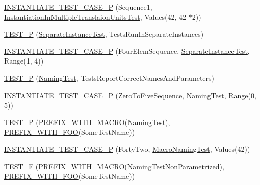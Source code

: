 \begin{DoxyCompactItemize}
\item 
\mbox{\hyperlink{googletest-param-test-test_8cc_a41c810122d57220f09f1e3d33b5a58a7}{I\+N\+S\+T\+A\+N\+T\+I\+A\+T\+E\+\_\+\+T\+E\+S\+T\+\_\+\+C\+A\+S\+E\+\_\+P}} (Sequence1, \mbox{\hyperlink{classInstantiationInMultipleTranslaionUnitsTest}{Instantiation\+In\+Multiple\+Translaion\+Units\+Test}}, Values(42, 42 $\ast$2))
\item 
\mbox{\hyperlink{googletest-param-test-test_8cc_ae517694af7a7a007acd12e9a7247afe9}{T\+E\+S\+T\+\_\+P}} (\mbox{\hyperlink{classSeparateInstanceTest}{Separate\+Instance\+Test}}, Tests\+Run\+In\+Separate\+Instances)
\item 
\mbox{\hyperlink{googletest-param-test-test_8cc_ac531206c956ac20121a4a6128e5d0912}{I\+N\+S\+T\+A\+N\+T\+I\+A\+T\+E\+\_\+\+T\+E\+S\+T\+\_\+\+C\+A\+S\+E\+\_\+P}} (Four\+Elem\+Sequence, \mbox{\hyperlink{classSeparateInstanceTest}{Separate\+Instance\+Test}}, Range(1, 4))
\item 
\mbox{\hyperlink{googletest-param-test-test_8cc_a1f8ae152b21130f3ca99bdeab97e872a}{T\+E\+S\+T\+\_\+P}} (\mbox{\hyperlink{classNamingTest}{Naming\+Test}}, Tests\+Report\+Correct\+Names\+And\+Parameters)
\item 
\mbox{\hyperlink{googletest-param-test-test_8cc_aa9659bbfc12103a583c0a221118b28ce}{I\+N\+S\+T\+A\+N\+T\+I\+A\+T\+E\+\_\+\+T\+E\+S\+T\+\_\+\+C\+A\+S\+E\+\_\+P}} (Zero\+To\+Five\+Sequence, \mbox{\hyperlink{classNamingTest}{Naming\+Test}}, Range(0, 5))
\item 
\mbox{\hyperlink{googletest-param-test-test_8cc_a268b3f484920a6a3c08d911a47f07509}{T\+E\+S\+T\+\_\+P}} (\mbox{\hyperlink{googletest-param-test-test_8cc_aeb9b224f65fb5b0b8f2323a6903d6a68}{P\+R\+E\+F\+I\+X\+\_\+\+W\+I\+T\+H\+\_\+\+M\+A\+C\+RO}}(\mbox{\hyperlink{classNamingTest}{Naming\+Test}}), \mbox{\hyperlink{googletest-param-test-test_8cc_a6414de581a925e7399b27c14e38f8a67}{P\+R\+E\+F\+I\+X\+\_\+\+W\+I\+T\+H\+\_\+\+F\+OO}}(Some\+Test\+Name))
\item 
\mbox{\hyperlink{googletest-param-test-test_8cc_a57f127249b7fcbce666fc162ee9c90d7}{I\+N\+S\+T\+A\+N\+T\+I\+A\+T\+E\+\_\+\+T\+E\+S\+T\+\_\+\+C\+A\+S\+E\+\_\+P}} (Forty\+Two, \mbox{\hyperlink{classMacroNamingTest}{Macro\+Naming\+Test}}, Values(42))
\item 
\mbox{\hyperlink{googletest-param-test-test_8cc_a025432fa6a1d1a07929f6897f2dfdaea}{T\+E\+S\+T\+\_\+F}} (\mbox{\hyperlink{googletest-param-test-test_8cc_aeb9b224f65fb5b0b8f2323a6903d6a68}{P\+R\+E\+F\+I\+X\+\_\+\+W\+I\+T\+H\+\_\+\+M\+A\+C\+RO}}(Naming\+Test\+Non\+Parametrized), \mbox{\hyperlink{googletest-param-test-test_8cc_a6414de581a925e7399b27c14e38f8a67}{P\+R\+E\+F\+I\+X\+\_\+\+W\+I\+T\+H\+\_\+\+F\+OO}}(Some\+Test\+Name))

\end{DoxyCompactItemize}
